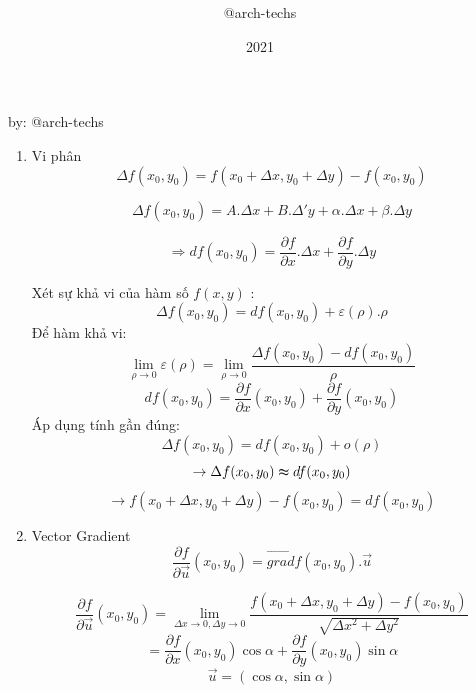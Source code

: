 \documentclass[15pt,a4paper]{report}
\title{\framebox {
        \textcolor{TEcolor}{
            \Huge {    CALCULUS II    }
        }
    }    }
\author{\Large @arch-techs}
\date{2021}
\begin{document}
{\selectfont
\begin{titlepage}
\maketitle
\end{titlepage}
\newpage

\begin{center}
    \begin{center}
    \end{center}
    
    \vspace{5mm}
    
    by: @arch-techs
    
    \vspace{1cm}
    
    \begin{enumerate}
        \item Vi phân
            \[\Delta f(x_{0}, y_{0}) = f(x_{0} + \Delta x, y_{0} + \Delta y) - f(x_{0}, y_{0})\]

            \[\Delta f(x_{0}, y_{0}) = A.\Delta x + B.\Delta'
             y + \alpha.\Delta x + \beta . \Delta y\]

             \[\Rightarrow df(x_0, y_{0}) = \dfrac{\partial f}{\partial x}.\Delta x + \dfrac{\partial f}{\partial y}.\Delta y\]

            Xét sự khả vi của hàm số $f(x, y)$ :
            \[\Delta f(x_{0}, y_{0}) = df(x_{0}, y_{0}) + \varepsilon (\rho ). \rho\]
            Để hàm khả vi:
            \[\lim_{\rho \to 0} \varepsilon(\rho) = \lim_{\rho \to 0} \dfrac{\Delta f(x_{0}, y_{0}) - df(x_{0}, y_{0})}{\rho}\]
            \[df(x_{0}, y_{0}) = \dfrac{\partial f}{\partial x}(x_{0}, y_{0}) + \dfrac{\partial f}{\partial y}(x_{0}, y_{0})\]
            Áp dụng tính gần đúng:
            \[\Delta f(x_{0}, y_{0}) = df(x_{0}, y_{0}) + o(\rho)\]
            \[\rightarrow \Delta f(x_{0}, y_{0}) \thickapprox df(x_{0}, y_{0})\]
            \[\rightarrow f(x_{0} + \Delta x, y_{0} + \Delta y) - f(x_0, y_{0}) = df(x_{0}, y_{0}) \]

        \item Vector Gradient
            \[\dfrac{\partial f}{\partial \overrightarrow{u}}(x_{0}, y_{0}) = \overrightarrow{grad}f(x_{0}, y_{0}) . \overrightarrow{u} \]
            
            \[\dfrac{\partial f}{\partial \overrightarrow{u}}(x_{0}, y_{0}) = \lim_{\Delta x \to 0, \Delta y \to 0}\dfrac{f(x_{0} + \Delta x, y_{0} + \Delta y) - f(x_{0}, y_{0})}{\sqrt{\Delta x ^{2}+ \Delta y^{2}}}\]    
            \[= \dfrac{\partial f}{\partial x}(x_{0}, y_{0})\cos \alpha + \dfrac{\partial f}{\partial y}(x_{0}, y_{0})\sin \alpha\]
            \[\overrightarrow{u} = (\cos \alpha, \sin \alpha)\]


\end{enumerate}
\end{center}}
\end{document}

